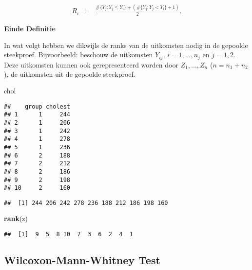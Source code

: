 \documentclass[12pt,dutch,coursenotes]{book}
\newenvironment{Shaded}{\begin{snugshade}}{\end{snugshade}}
\newcommand{\KeywordTok}[1]{\textcolor[rgb]{0.13,0.29,0.53}{\textbf{#1}}}
\newcommand{\StringTok}[1]{\textcolor[rgb]{0.31,0.60,0.02}{#1}}
\newcommand{\OperatorTok}[1]{\textcolor[rgb]{0.81,0.36,0.00}{\textbf{#1}}}
\newcommand{\NormalTok}[1]{#1}
\theoremstyle{definition}
\theoremstyle{definition}
\theoremstyle{definition}
\theoremstyle{remark}
\begin{document}
\begin{eqnarray*}
   R_i &=& \frac{ \#\{Y_j: Y_j\leq Y_i\} + ( \#\{Y_j: Y_j < Y_i\} +1)}{2}.
    \end{eqnarray*}

\textbf{Einde Definitie}

In wat volgt hebben we dikwijls de ranks van de uitkomsten nodig in de
gepoolde steekproef. Bijvoorbeeld: beschouw de uitkomsten \(Y_{ij}\),
\(i=1,\ldots, n_j\) en \(j=1,2\). Deze uitkomsten kunnen ook
gerepresenteerd worden door \(Z_1,\ldots, Z_n\) (\(n=n_1+n_2\)), de
uitkomsten uit de gepoolde steekproef.

\begin{Shaded}
\begin{Highlighting}[]
\NormalTok{chol}
\end{Highlighting}
\end{Shaded}

\begin{verbatim}
##    group cholest
## 1      1     244
## 2      1     206
## 3      1     242
## 4      1     278
## 5      1     236
## 6      2     188
## 7      2     212
## 8      2     186
## 9      2     198
## 10     2     160
\end{verbatim}

\begin{Shaded}
\end{Shaded}

\begin{verbatim}
##  [1] 244 206 242 278 236 188 212 186 198 160
\end{verbatim}

\begin{Shaded}
\begin{Highlighting}[]
\KeywordTok{rank}\NormalTok{(z)}
\end{Highlighting}
\end{Shaded}

\begin{verbatim}
##  [1]  9  5  8 10  7  3  6  2  4  1
\end{verbatim}

\subsection{Wilcoxon-Mann-Whitney
Test}\label{wilcoxon-mann-whitney-test}
\end{document}
